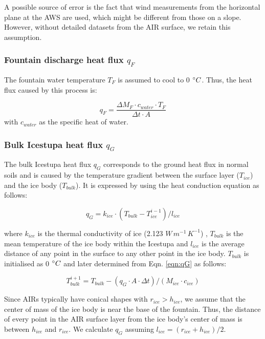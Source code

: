 \documentclass[utf8]{frontiersSCNS} %
\begin{document}
A possible source of error is the fact that wind measurements from the horizontal plane at the AWS are used, which might
be different from those on a slope. However, without detailed datasets from the AIR surface, we retain this assumption.

\subsubsection{Fountain discharge heat flux \texorpdfstring{$q_{F}$}{Lg} }

The fountain water temperature $T_F$ is assumed to cool to 0 $\degree C$. Thus, the heat flux caused by this process is:

\begin{equation}
	q_{F} = \frac{ \Delta M_F \cdot c_{water} \cdot T_F}{\Delta t \cdot A}
	\label{eqn:qF}
\end{equation}
with $c_{water}$ as the specific heat of water.

\subsubsection{Bulk Icestupa heat flux \texorpdfstring{$q_{G}$}{Lg}} \label{sec:Bulkflux}

The bulk Icestupa heat flux $q_{G}$ corresponds to the ground heat flux in normal soils and is caused by the temperature
gradient between the surface layer ($T_{ice}$) and the ice body ($T_{bulk}$). It is expressed by using the heat
conduction equation as follows:

\begin{equation} q_{G} = k_{ice} \cdot (T_{bulk}-T_{ice}^{i-1})/l_{ice} \label{eqn:qG}    \end{equation}

where $k_{ice}$ is the thermal conductivity of ice (2.123 $W\, m^{-1}\,K^{-1}$) , $T_{bulk}$ is the mean temperature of
the ice body within the Icestupa and $l_{ice}$ is the average distance of any point in the surface to any other point in
the ice body. $T_{bulk}$ is initialised as 0 $\degree C$ and later determined from Eqn. \ref{eqn:qG} as follows:

\begin{equation} T_{bulk}^{i+1} = T_{bulk} - (q_{G} \cdot A \cdot \Delta t)/(M_{ice} \cdot c_{ice}) \end{equation}

Since AIRs typically have conical shapes with $r_{ice} > h_{ice}$, we assume that the center of mass of the ice body is
near the base of the fountain. Thus, the distance of every point in the AIR surface layer from the ice body's center of
mass is between $h_{ice}$ and $r_{ice}$. We calculate $q_{G}$ assuming $l_{ice} = (r_{ice} + h_{ice})/2$.
\end{document}
